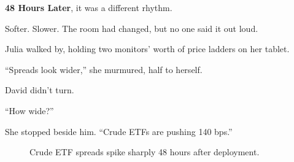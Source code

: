 \textbf{48 Hours Later}, it was a different rhythm.

Softer. Slower.
The room had changed, but no one said it out loud.

Julia walked by, holding two monitors’ worth of price ladders on her tablet.

“Spreads look wider,” she murmured, half to herself.

David didn’t turn.

“How wide?”

She stopped beside him. “Crude ETFs are pushing 140 bps.”

\medskip

\begin{figure}[H]
  \centering
  \caption{Crude ETF spreads spike sharply 48 hours after deployment.}
\end{figure}

\medskip

